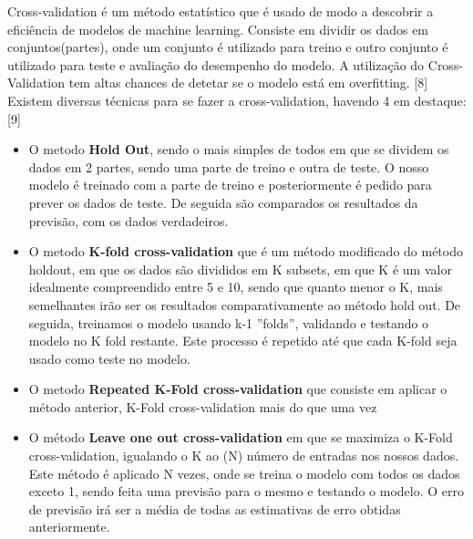 Cross-validation é um método estatístico que é usado de modo a descobrir a eficiência de modelos de machine learning. Consiste em dividir os dados em conjuntos(partes), onde um conjunto é utilizado para treino e outro conjunto é utilizado para teste e avaliação do desempenho do modelo. A utilização do Cross-Validation tem altas chances de detetar se o modelo está em overfitting. [8]
Existem diversas técnicas para se fazer a cross-validation, havendo 4 em destaque:
[9]
\begin{itemize}
\item O metodo \textbf{Hold Out}, sendo o mais simples de todos em que se dividem os dados em 2 partes, sendo uma parte de treino e outra de teste. O nosso modelo é treinado com a parte de treino e posteriormente é pedido para prever os dados de teste. De seguida são comparados os resultados da previsão, com os dados verdadeiros.

\item O metodo \textbf{K-fold cross-validation} que é um método modificado do método holdout, em que os dados são divididos em K subsets, em que K é um valor idealmente compreendido entre 5 e 10, sendo que quanto menor o K, mais semelhantes irão ser os resultados comparativamente ao método hold out. De seguida, treinamos o modelo usando k-1 ”folds”, validando e testando o modelo no K fold restante. Este processo é repetido até que cada K-fold seja usado como teste no modelo.

\item O metodo \textbf{Repeated K-Fold cross-validation} que consiste em aplicar o método anterior, K-Fold cross-validation mais do que uma vez

\item O método \textbf{Leave one out cross-validation} em que se maximiza o K-Fold cross-validation, igualando o K ao (N) número de entradas nos nossos dados. Este método é aplicado N vezes, onde se treina o modelo com todos os dados exceto 1, sendo feita uma previsão para o mesmo e testando o modelo. O erro de previsão irá ser a média de todas as estimativas de erro obtidas anteriormente.
\end{itemize}

